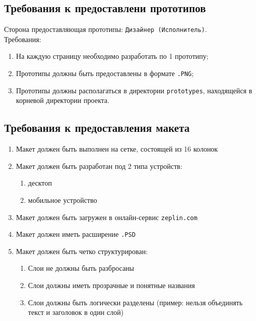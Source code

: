 \subsection{Требования к предоставлени прототипов}
Сторона предоставляющая прототипы: \texttt{Дизайнер (Исполнитель)}.\\
Требования:
\begin{enumerate}
  \item На каждую страницу необходимо разработать по 1 прототипу;
  \item Прототипы должны быть предоставлены в формате \texttt{.PNG};
  \item Прототипы должны располагаться в директории \texttt{prototypes}, находящейся в корневой директории проекта.
\end{enumerate}

\subsection{Требования к предоставления макета }
\begin{enumerate}
  \item Макет должен быть выполнен на сетке, состоящей из 16 колонок
  \item Макет должен быть разработан под 2 типа устройств:\\
  \begin{enumerate}
    \item десктоп
    \item мобильное устройство
  \end{enumerate}
  \item Макет должен быть загружен в онлайн-сервис \texttt{zeplin.com}
  \item Макет должен иметь расширение \texttt{.PSD}
  \item Макет должен быть четко структурирован:
  \begin{enumerate}
    \item Слои не должны быть разбросаны
    \item Слои должны иметь прозрачные и понятные названия
    \item Слои должны быть логически разделены (пример: нельзя объединять текст и заголовок в один слой)
  \end{enumerate}
\end{enumerate}
